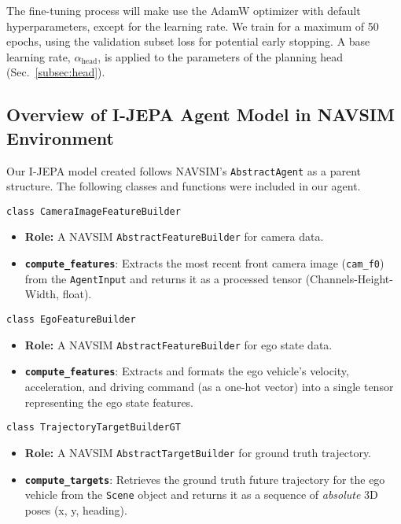\documentclass{article}
\begin{document}
The fine-tuning process will make use the AdamW optimizer \cite{loshchilov2017decoupled} with default hyperparameters, except for the learning rate. We train for a maximum of 50 epochs, using the validation subset loss for potential early stopping. A base learning rate, $\alpha_{\text{head}}$, is applied to the parameters of the planning head (Sec.~\ref{subsec:head}). 


\subsection{Overview of I-JEPA Agent Model in NAVSIM Environment}
Our I-JEPA model created follows NAVSIM's \texttt{AbstractAgent} as a parent structure. The following classes and functions were included in our agent.

\texttt{class CameraImageFeatureBuilder}
\begin{itemize}
    \item \textbf{Role:} A NAVSIM \texttt{AbstractFeatureBuilder} for camera data.
    \item \textbf{\texttt{compute\_features}}: Extracts the most recent front camera image (\texttt{cam\_f0}) from the \texttt{AgentInput} and returns it as a processed tensor (Channels-Height-Width, float).
\end{itemize}

\texttt{class EgoFeatureBuilder}
\begin{itemize}
    \item \textbf{Role:} A NAVSIM \texttt{AbstractFeatureBuilder} for ego state data.
    \item \textbf{\texttt{compute\_features}}: Extracts and formats the ego vehicle's velocity, acceleration, and driving command (as a one-hot vector) into a single tensor representing the ego state features.
\end{itemize}

\texttt{class TrajectoryTargetBuilderGT}
\begin{itemize}
    \item \textbf{Role:} A NAVSIM \texttt{AbstractTargetBuilder} for ground truth trajectory.
    \item \textbf{\texttt{compute\_targets}}: Retrieves the ground truth future trajectory for the ego vehicle from the \texttt{Scene} object and returns it as a sequence of \emph{absolute} 3D poses (x, y, heading).
\end{itemize}
\end{document}
